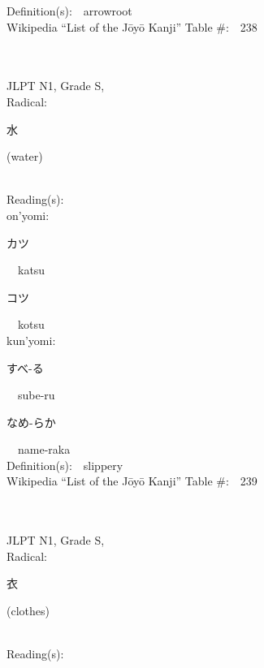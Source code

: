 \begin{multicols}{2}
Definition(s):\ \ arrowroot \\
Wikipedia ``List of the J\=oy\=o Kanji'' Table \#:\ \ 238 \\
\ \ \\
{\fontsize{34pt}{40pt}  }\ \ \\
{JLPT N1, Grade S, \\Radical:\ \ {\begin{CJK}{UTF8}{min} 水 \end{CJK}} (water) } \\
Reading(s):\ \ \\
{\hspace*{1em}}on'yomi:\ \ \\
{\hspace*{2em}}{\begin{CJK}{UTF8}{min} カツ \end{CJK}}\ \ katsu\ \ \\
{\hspace*{2em}}{\begin{CJK}{UTF8}{min} コツ \end{CJK}}\ \ kotsu\ \ \\
{\hspace*{1em}}kun'yomi:\ \ \\
{\hspace*{2em}}{\begin{CJK}{UTF8}{min} すべ-る \end{CJK}}\ \ sube-ru\ \ \\
{\hspace*{2em}}{\begin{CJK}{UTF8}{min} なめ-らか \end{CJK}}\ \ name-raka\ \ \\
Definition(s):\ \ slippery \\
Wikipedia ``List of the J\=oy\=o Kanji'' Table \#:\ \ 239 \\
\ \ \\
{\fontsize{34pt}{40pt}  }\ \ \\
{JLPT N1, Grade S, \\Radical:\ \ {\begin{CJK}{UTF8}{min} 衣 \end{CJK}} (clothes) } \\
Reading(s):\ \ \\

\end{multicols}
